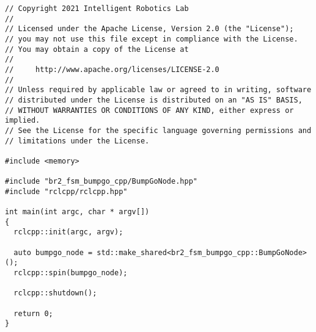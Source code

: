  \footnotesize
\begin{tcolorbox}[sharp corners, colframe=gray!80, colback=LightGray, left=0pt, top=0pt, bottom=0pt, title=\texttt{br2\_fsm\_bumpgo\_cpp/src/bumpgo\_main.cpp}]
  \begin{verbatim}
// Copyright 2021 Intelligent Robotics Lab
//
// Licensed under the Apache License, Version 2.0 (the "License");
// you may not use this file except in compliance with the License.
// You may obtain a copy of the License at
//
//     http://www.apache.org/licenses/LICENSE-2.0
//
// Unless required by applicable law or agreed to in writing, software
// distributed under the License is distributed on an "AS IS" BASIS,
// WITHOUT WARRANTIES OR CONDITIONS OF ANY KIND, either express or implied.
// See the License for the specific language governing permissions and
// limitations under the License.

#include <memory>

#include "br2_fsm_bumpgo_cpp/BumpGoNode.hpp"
#include "rclcpp/rclcpp.hpp"

int main(int argc, char * argv[])
{
  rclcpp::init(argc, argv);

  auto bumpgo_node = std::make_shared<br2_fsm_bumpgo_cpp::BumpGoNode>();
  rclcpp::spin(bumpgo_node);

  rclcpp::shutdown();

  return 0;
}
    \end{verbatim}
    \end{tcolorbox}
  \normalsize

